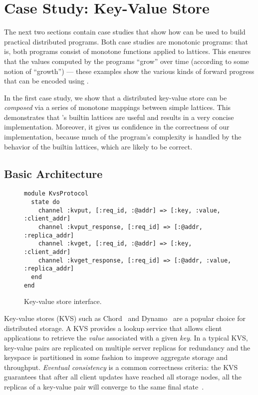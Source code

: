 \section{Case Study: Key-Value Store}
\label{sec:kvs}
The next two sections contain case studies that show how \lang can be used to
build practical distributed programs. Both case studies are monotonic programs:
that is, both programs consist of monotone functions applied to lattices. This
ensures that the values computed by the programs ``grow'' over time (according
to some notion of ``growth'') --- these examples show the various kinds of
forward progress that can be encoded using \lang.

In the first case study, we show that a distributed key-value store can be
\emph{composed} via a series of monotone mappings between simple lattices. This
demonstrates that \lang's builtin lattices are useful and results in a very
concise implementation. Moreover, it gives us confidence in the correctness of
our implementation, because much of the program's complexity is handled by the
behavior of the builtin lattices, which are likely to be correct.

\subsection{Basic Architecture}
\begin{figure}[t]
\begin{scriptsize}
\begin{lstlisting}
module KvsProtocol
  state do
    channel :kvput, [:req_id, :@addr] => [:key, :value, :client_addr]
    channel :kvput_response, [:req_id] => [:@addr, :replica_addr]
    channel :kvget, [:req_id, :@addr] => [:key, :client_addr]
    channel :kvget_response, [:req_id] => [:@addr, :value, :replica_addr]
  end
end
\end{lstlisting}
\end{scriptsize}
\caption{Key-value store interface.}
\label{fig:kvs-interface}
\end{figure}

Key-value stores (KVS) such as Chord~\cite{Stoica2001} and
Dynamo~\cite{DeCandia2007} are a popular choice for distributed storage. A KVS
provides a lookup service that allows client applications to retrieve the
\emph{value} associated with a given \emph{key}. In a typical KVS, key-value
pairs are replicated on multiple server replicas for redundancy and the keyspace
is partitioned in some fashion to improve aggregate storage and
throughput. \emph{Eventual consistency} is a common correctness criteria: the
KVS guarantees that after all client updates have reached all storage nodes, all
the replicas of a key-value pair will converge to the same final
state~\cite{vogels}.

